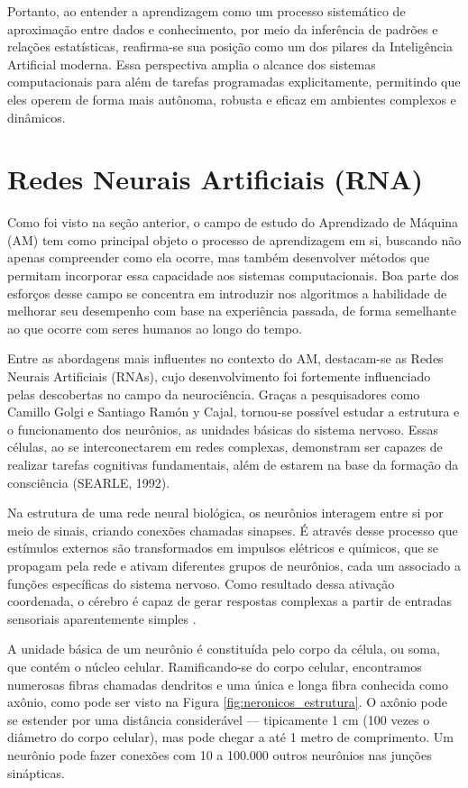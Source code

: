 Portanto, ao entender a aprendizagem como um processo sistemático de aproximação entre dados e conhecimento, por meio da inferência de padrões e relações estatísticas, reafirma-se sua posição como um dos pilares da Inteligência Artificial moderna. Essa perspectiva amplia o alcance dos sistemas computacionais para além de tarefas programadas explicitamente, permitindo que eles operem de forma mais autônoma, robusta e eficaz em ambientes complexos e dinâmicos.


\section{Redes Neurais Artificiais (RNA)}
\label{sec:redes-neurais-artificiais}

Como foi visto na seção anterior, o campo de estudo do Aprendizado de Máquina (AM) tem como principal objeto o processo de aprendizagem em si, buscando não apenas compreender como ela ocorre, mas também desenvolver métodos que permitam incorporar essa capacidade aos sistemas computacionais. Boa parte dos esforços desse campo se concentra em introduzir nos algoritmos a habilidade de melhorar seu desempenho com base na experiência passada, de forma semelhante ao que ocorre com seres humanos ao longo do tempo.

Entre as abordagens mais influentes no contexto do AM, destacam-se as Redes Neurais Artificiais (RNAs), cujo desenvolvimento foi fortemente influenciado pelas descobertas no campo da neurociência. Graças a pesquisadores como Camillo Golgi e Santiago Ramón y Cajal, tornou-se possível estudar a estrutura e o funcionamento dos neurônios, as unidades básicas do sistema nervoso. Essas células, ao se interconectarem em redes complexas, demonstram ser capazes de realizar tarefas cognitivas fundamentais, além de estarem na base da formação da consciência (SEARLE, 1992).

Na estrutura de uma rede neural biológica, os neurônios interagem entre si por meio de sinais, criando conexões chamadas sinapses. É através desse processo que estímulos externos são transformados em impulsos elétricos e químicos, que se propagam pela rede e ativam diferentes grupos de neurônios, cada um associado a funções específicas do sistema nervoso. Como resultado dessa ativação coordenada, o cérebro é capaz de gerar respostas complexas a partir de entradas sensoriais aparentemente simples \cite{kandel_principles_2013}.

A unidade básica de um neurônio é constituída pelo corpo da célula, ou soma, que contém o núcleo celular. Ramificando-se do corpo celular, encontramos numerosas fibras chamadas dendritos e uma única e longa fibra conhecida como axônio, como pode ser visto na Figura \ref{fig:neronicos_estrutura}. O axônio pode se estender por uma distância considerável — tipicamente 1 cm (100 vezes o diâmetro do corpo celular), mas pode chegar a até 1 metro de comprimento. Um neurônio pode fazer conexões com 10 a 100.000 outros neurônios nas junções sinápticas.

